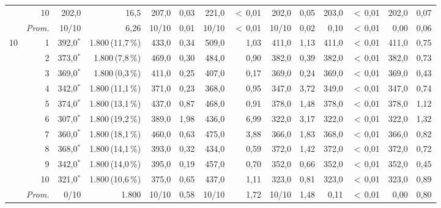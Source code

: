 \documentclass[11pt,a4paper]{article}
\begin{document}
\begin{table}[htbp]
{\begin{tabular}{rr rr rr rr rr rr rr}
 & 10 & 202{,}0 & 16{,}5 & 207{,}0 & 0{,}03 & 221{,}0 & $<$\,0{,}01 & 202{,}0 & 0{,}05 & 203{,}0 & $<$\,0{,}01 & 202{,}0 & 0{,}07 \\
\cmidrule(l){2-14}
 & \emph{Prom.} & 10/10 & 6{,}26 & 10/10 & 0{,}01 & 10/10 & $<$\,0{,}01 & 10/10 & 0{,}02 & 0{,}10 & $<$\,0{,}01 & 0{,}00 & 0{,}06 \\
\midrule
10 & 1 & 392{,}0$^{*}$ & 1.800\,{\scriptsize(11{,}7\,\%)} & 433{,}0 & 0{,}34 & 509{,}0 & 1{,}03 & 411{,}0 & 1{,}13 & 411{,}0 & $<$\,0{,}01 & 411{,}0 & 0{,}75 \\
 & 2 & 373{,}0$^{*}$ & 1.800\,{\scriptsize(7{,}8\,\%)} & 469{,}0 & 0{,}30 & 484{,}0 & 0{,}90 & 382{,}0 & 0{,}39 & 382{,}0 & $<$\,0{,}01 & 382{,}0 & 0{,}73 \\
 & 3 & 369{,}0$^{*}$ & 1.800\,{\scriptsize(0{,}3\,\%)} & 411{,}0 & 0{,}25 & 407{,}0 & 0{,}17 & 369{,}0 & 0{,}24 & 369{,}0 & $<$\,0{,}01 & 369{,}0 & 0{,}43 \\
 & 4 & 342{,}0$^{*}$ & 1.800\,{\scriptsize(11{,}1\,\%)} & 371{,}0 & 0{,}23 & 368{,}0 & 0{,}95 & 347{,}0 & 3{,}72 & 349{,}0 & $<$\,0{,}01 & 347{,}0 & 0{,}74 \\
 & 5 & 374{,}0$^{*}$ & 1.800\,{\scriptsize(13{,}1\,\%)} & 437{,}0 & 0{,}87 & 468{,}0 & 0{,}91 & 378{,}0 & 1{,}48 & 378{,}0 & $<$\,0{,}01 & 378{,}0 & 1{,}12 \\
 & 6 & 307{,}0$^{*}$ & 1.800\,{\scriptsize(19{,}2\,\%)} & 389{,}0 & 1{,}98 & 436{,}0 & 6{,}99 & 322{,}0 & 3{,}17 & 322{,}0 & $<$\,0{,}01 & 322{,}0 & 1{,}32 \\
 & 7 & 360{,}0$^{*}$ & 1.800\,{\scriptsize(18{,}1\,\%)} & 460{,}0 & 0{,}63 & 475{,}0 & 3{,}88 & 366{,}0 & 1{,}83 & 368{,}0 & $<$\,0{,}01 & 366{,}0 & 0{,}82 \\
 & 8 & 368{,}0$^{*}$ & 1.800\,{\scriptsize(14{,}1\,\%)} & 393{,}0 & 0{,}32 & 434{,}0 & 0{,}59 & 372{,}0 & 1{,}42 & 372{,}0 & $<$\,0{,}01 & 372{,}0 & 0{,}72 \\
 & 9 & 342{,}0$^{*}$ & 1.800\,{\scriptsize(14{,}0\,\%)} & 395{,}0 & 0{,}19 & 457{,}0 & 0{,}70 & 352{,}0 & 0{,}66 & 352{,}0 & $<$\,0{,}01 & 352{,}0 & 0{,}45 \\
 & 10 & 321{,}0$^{*}$ & 1.800\,{\scriptsize(10{,}6\,\%)} & 375{,}0 & 0{,}65 & 437{,}0 & 1{,}11 & 323{,}0 & 0{,}81 & 323{,}0 & $<$\,0{,}01 & 323{,}0 & 0{,}89 \\
\cmidrule(l){2-14}
 & \emph{Prom.} & 0/10 & 1.800 & 10/10 & 0{,}58 & 10/10 & 1{,}72 & 10/10 & 1{,}48 & 0{,}11 & $<$\,0{,}01 & 0{,}00 & 0{,}80 \\
\bottomrule
\end{tabular}%
}
\end{table}
\end{document}
